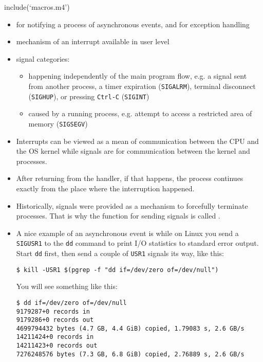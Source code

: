 include(`macros.m4')


\begin{slide}
\end{slide}


\begin{slide}
\begin{itemize}
\item for notifying a process of asynchronous events, and for exception handling
\item mechanism of an interrupt available in user level
\item signal categories:
    \begin{itemize}
    \item {} happening independently of the main program
    flow, e.g. a signal sent from another process, a timer expiration
    (\texttt{SIGALRM}), terminal disconnect (\texttt{SIGHUP}), or pressing
    \texttt{Ctrl-C} (\texttt{SIGINT})
    \item {} caused by a running process, e.g.
    attempt to access a restricted area of memory (\texttt{SIGSEGV})
    \end{itemize}
\end{itemize}
\end{slide}

\label{SIGNALS}

\begin{itemize}
\item Interrupts can be viewed as a mean of communication between the CPU and
the OS kernel while signals are for communication between the kernel and
processes.
\item After returning from the handler, if that happens, the process continues
exactly from the place where the interruption happened.
\item Historically, signals were provided as a mechanism to forcefully terminate
processes.  That is why the function for sending signals is called
.
\item A nice example of an asynchronous event is while on Linux you send
a \texttt{SIGUSR1} to the \texttt{dd} command to print I/O statistics to
standard error output.  Start \texttt{dd} first, then send a couple of
\texttt{USR1} signals its way, like this:

\begin{verbatim}
$ kill -USR1 $(pgrep -f "dd if=/dev/zero of=/dev/null")
\end{verbatim}

You will see something like this:

\begin{verbatim}
$ dd if=/dev/zero of=/dev/null
9179287+0 records in
9179286+0 records out
4699794432 bytes (4.7 GB, 4.4 GiB) copied, 1.79083 s, 2.6 GB/s
14211424+0 records in
14211423+0 records out
7276248576 bytes (7.3 GB, 6.8 GiB) copied, 2.76889 s, 2.6 GB/s
\end{verbatim}
\end{itemize}

